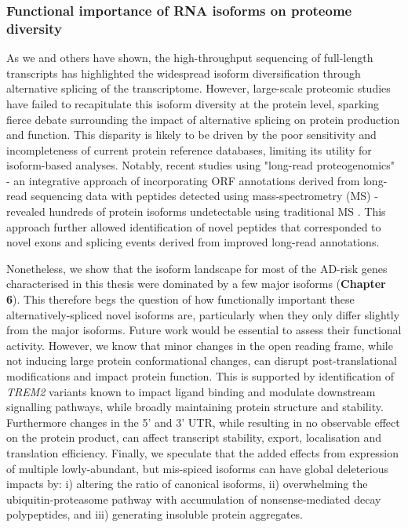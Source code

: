 \subsubsection{Functional importance of RNA isoforms on proteome diversity} 
As we and others have shown, the high-throughput sequencing of full-length transcripts has highlighted the widespread isoform diversification through alternative splicing of the transcriptome. However, large-scale proteomic studies have failed to recapitulate this isoform diversity at the protein level, sparking fierce debate surrounding the impact of alternative splicing on protein production and function\cite{Tress2017a,Blencowe2017,Tress2017b}. This disparity is likely to be driven by the poor sensitivity and incompleteness of current protein reference databases, limiting its utility for isoform-based analyses\cite{Reixachs-Sole2022}. Notably, recent studies using "long-read proteogenomics" - an integrative approach of incorporating ORF annotations derived from long-read sequencing data with peptides detected using mass-spectrometry (MS) - revealed hundreds of protein isoforms undetectable using traditional MS \cite{Miller2022,Wang2019a}. This approach further allowed identification of novel peptides that corresponded to novel exons and splicing events derived from improved long-read annotations\cite{Miller2022}.  

Nonetheless, we show that the isoform landscape for most of the AD-risk genes characterised in this thesis were dominated by a few major isoforms (\textbf{Chapter 6}). This therefore begs the question of how functionally important these alternatively-spliced novel isoforms are, particularly when they only differ slightly from the major isoforms. Future work would be essential to assess their functional activity. However, we know that minor changes in the open reading frame, while not inducing large protein conformational changes, can disrupt post-translational modifications and impact protein function\cite{Reixachs-Sole2022}. This is supported by identification of \textit{TREM2} variants known to impact ligand binding and modulate downstream signalling pathways, while broadly maintaining protein structure and stability\cite{Kober2016}. Furthermore changes in the 5' and 3' UTR, while resulting in no observable effect on the protein product, can affect transcript stability, export, localisation and translation efficiency\cite{Reixachs-Sole2022}. Finally, we speculate that the added effects from expression of multiple lowly-abundant, but mis-spiced isoforms can have global deleterious impacts by: i) altering the ratio of canonical isoforms, ii) overwhelming the ubiquitin-proteasome pathway with accumulation of nonsense-mediated decay polypeptides, and iii) generating insoluble protein aggregates. 

